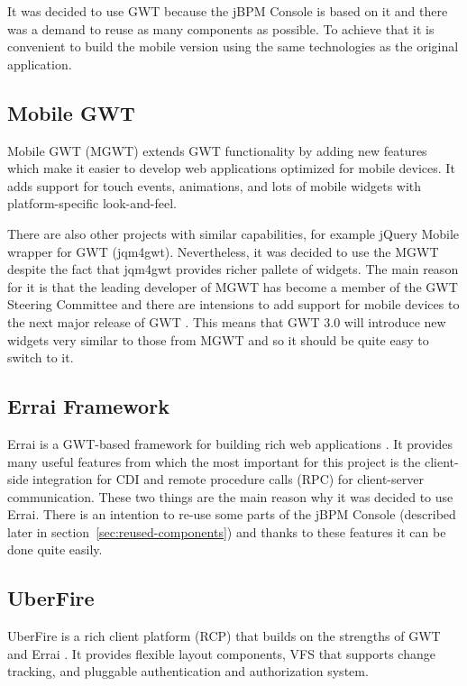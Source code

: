 \documentclass[12pt,oneside,final]{fithesis2}
\begin{document}
It was decided to use GWT because the jBPM Console is based on it and there was a demand to reuse as many components as possible.
To achieve that it is convenient to build the mobile version using the same technologies as the original application.

\subsection{Mobile GWT}
Mobile GWT (MGWT) extends GWT functionality by adding new features which make it easier to develop web applications optimized for mobile devices.
It adds support for touch events, animations, and lots of mobile widgets with platform-specific look-and-feel.

There are also other projects with similar capabilities, for example jQuery Mobile wrapper for GWT\footnotemark{} (jqm4gwt).
Nevertheless, it was decided to use the MGWT despite the fact that jqm4gwt provides richer pallete of widgets.
The main reason for it is that the leading developer of MGWT has become a member of the GWT Steering Committee and there are intensions to add support for mobile devices to the next major release of GWT \cite{gwtroadmap}.
This means that GWT 3.0 will introduce new widgets very similar to those from MGWT and so it should be quite easy to switch to it.

\subsection{Errai Framework}
Errai is a GWT-based framework for building rich web applications \cite{erraidoc}.
It provides many useful features from which the most important for this project is the client-side integration for CDI\footnotemark{} and remote procedure calls (RPC) for client-server communication.
These two things are the main reason why it was decided to use Errai.
There is an intention to re-use some parts of the jBPM Console (described later in section~\ref{sec:reused-components}) and thanks to these features it can be done quite easily.

\subsection{UberFire}
UberFire is a rich client platform (RCP) that builds on the strengths of GWT and Errai \cite{uberfire}.
It provides flexible layout components, VFS that supports change tracking, and pluggable authentication and authorization system.
\end{document}
